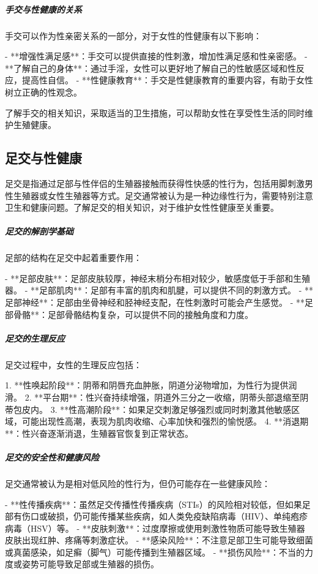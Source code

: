\begin{enumerate}
\subparagraph{手交与性健康的关系}

手交可以作为性亲密关系的一部分，对于女性的性健康有以下影响：

- **增强性满足感**：手交可以提供直接的性刺激，增加性满足感和性亲密感。
- **了解自己的身体**：通过手淫，女性可以更好地了解自己的性敏感区域和性反应，提高性自信。
- **性健康教育**：手交是性健康教育的重要内容，有助于女性树立正确的性观念。

了解手交的相关知识，采取适当的卫生措施，可以帮助女性在享受性生活的同时维护生殖健康。

\subsection{足交与性健康}

足交是指通过足部与性伴侣的生殖器接触而获得性快感的性行为，包括用脚刺激男性生殖器或女性生殖器等方式。足交通常被认为是一种边缘性行为，需要特别注意卫生和健康问题。了解足交的相关知识，对于维护女性性健康至关重要。

\subparagraph{足交的解剖学基础}

足部的结构在足交中起着重要作用：

- **足部皮肤**：足部皮肤较厚，神经末梢分布相对较少，敏感度低于手部和生殖器。
- **足部肌肉**：足部有丰富的肌肉和肌腱，可以提供不同的刺激方式。
- **足部神经**：足部由坐骨神经和胫神经支配，在性刺激时可能会产生感觉。
- **足部骨骼**：足部骨骼结构复杂，可以提供不同的接触角度和力度。

\subparagraph{足交的生理反应}

足交过程中，女性的生理反应包括：

1. **性唤起阶段**：阴蒂和阴唇充血肿胀，阴道分泌物增加，为性行为提供润滑。
2. **平台期**：性兴奋持续增强，阴道外三分之一收缩，阴蒂头部退缩至阴蒂包皮内。
3. **性高潮阶段**：如果足交刺激足够强烈或同时刺激其他敏感区域，可能出现性高潮，表现为肌肉收缩、心率加快和强烈的愉悦感。
4. **消退期**：性兴奋逐渐消退，生殖器官恢复到正常状态。

\subparagraph{足交的安全性和健康风险}

足交通常被认为是相对低风险的性行为，但仍可能存在一些健康风险：

- **性传播疾病**：虽然足交传播性传播疾病（STIs）的风险相对较低，但如果足部有伤口或破损，仍可能传播某些疾病，如人类免疫缺陷病毒（HIV）、单纯疱疹病毒（HSV）等。
- **皮肤刺激**：过度摩擦或使用刺激性物质可能导致生殖器皮肤出现红肿、疼痛等刺激症状。
- **感染风险**：不注意足部卫生可能导致细菌或真菌感染，如足癣（脚气）可能传播到生殖器区域。
- **损伤风险**：不当的力度或姿势可能导致足部或生殖器的损伤。


\end{enumerate}
